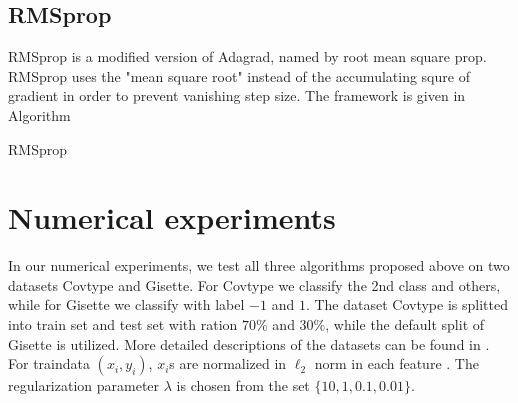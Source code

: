 \documentclass{article}
\begin{document}
\subsection{RMSprop}
RMSprop is a modified version of Adagrad, named by root mean square prop. RMSprop uses the "mean square root" instead of the accumulating squre of gradient in order to prevent vanishing step size. The framework is given in Algorithm 
\begin{algorithm}[H]
	\caption{RMSprop}
	\begin{algorithmic}[1]\label{RMSprop}
		\ENDWHILE 
	\end{algorithmic}
\end{algorithm}
\section{Numerical experiments}
In our numerical experiments, we test all three algorithms proposed above on two datasets Covtype and Gisette. For Covtype we classify the 2nd class and others, while for Gisette we classify with label $-1$ and $1$. The dataset Covtype is splitted into train set and test set with ration $70\%$ and $30\%$, while the default split of Gisette is utilized. More detailed descriptions of the datasets can be found in \cite{bollapragada2019exact}. For  traindata $(x_i,y_i)$, $x_i$s are normalized in $\ell_2$ norm in each feature . The regularization parameter $\lambda$ is chosen from the set $\{10,1,0.1,0.01\}$.
\end{document}
